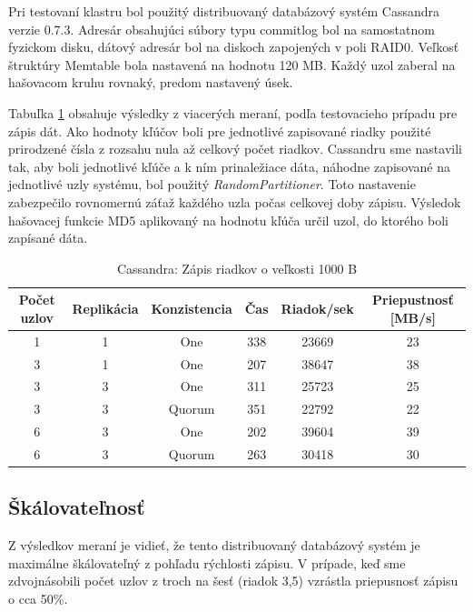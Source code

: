 \documentclass[11pt,twoside,a4paper]{book}
\begin{document}
Pri testovaní klastru bol použitý distribuovaný databázový systém Cassandra verzie 0.7.3. Adresár obsahujúci súbory typu commitlog bol na samostatnom fyzickom disku, dátový adresár bol na diskoch zapojených v poli RAID0. Veľkosť štruktúry Memtable bola nastavená na hodnotu 120 MB. Každý uzol zaberal na hašovacom kruhu rovnaký, predom nastavený úsek.

Tabuľka \ref{tab:CPerf2} obsahuje výsledky z viacerých meraní, podľa testovacieho prípadu pre zápis dát. Ako hodnoty kľúčov boli pre jednotlivé zapisované riadky použité prirodzené čísla z rozsahu nula až celkový počet riadkov. Cassandru sme nastavili tak, aby boli jednotlivé kľúče a k ním prinaležiace dáta, náhodne zapisované na jednotlivé uzly systému, bol použitý \emph{RandomPartitioner}. Toto nastavenie zabezpečilo rovnomernú záťaž každého uzla počas celkovej doby zápisu. Výsledok hašovacej funkcie MD5 aplikovaný na hodnotu kľúča určil uzol, do ktorého boli zapísané dáta.

\begin{table}[hp]
\begin{center}
\begin{tabular}{|c|c|c|c|c|c|}
\hline Počet uzlov & Replikácia & Konzistencia & Čas & Riadok/sek & Priepustnosť [MB/s]\\ 
\hline
\hline 1 & 1 & One & 338 & 23669 & 23\\ 
\hline 3 & 1 & One & 207 & 38647 & 38\\ 
\hline 3 & 3 & One & 311 & 25723 & 25\\ 
\hline 3 & 3 & Quorum & 351 & 22792 & 22\\ 
\hline 6 & 3 & One & 202 & 39604 & 39\\ 
\hline 6 & 3 & Quorum & 263 & 30418 & 30\\ 
\hline
\end{tabular} 
\end{center}
\caption{Cassandra: Zápis riadkov o veľkosti 1000 B}
\label{tab:CPerf2}
\end{table}

\subsection*{Škálovateľnosť}

Z výsledkov meraní je vidieť, že tento distribuovaný databázový systém je maximálne škálovateľný z pohľadu rýchlosti zápisu. V prípade, keď sme zdvojnásobili počet uzlov z troch na šesť (riadok 3,5) vzrástla priepusnosť zápisu o cca 50\%.
\end{document}
